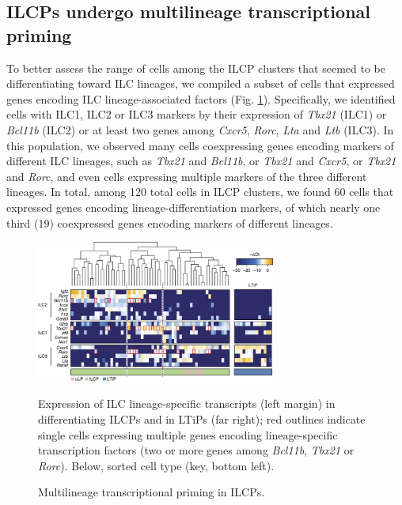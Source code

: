 \subsection{ILCPs undergo multilineage transcriptional priming}

To better assess the range of cells among the ILCP clusters that seemed to be differentiating toward ILC lineages, we compiled a subset of cells that expressed genes encoding ILC lineage-associated factors (Fig. \ref{fig:chap3_F6}). Specifically, we identified cells with ILC1, ILC2 or ILC3 markers by their expression of \textit{Tbx21} (ILC1) or \textit{Bcl11b} (ILC2) or at least two genes among \textit{Cxcr5}, \textit{Rorc}, \textit{Lta} and \textit{Ltb} (ILC3). In this population, we observed many cells coexpressing genes encoding markers of different ILC lineages, such as \textit{Tbx21} and \textit{Bcl11b}, or \textit{Tbx21} and \textit{Cxcr5}, or \textit{Tbx21} and \textit{Rorc}, and even cells expressing multiple markers of the three different lineages. In total, among 120 total cells in ILCP clusters, we found 60 cells that expressed genes encoding lineage-differentiation markers, of which nearly one third (19) coexpressed genes encoding markers of different lineages.

\begin{figure}[h]
\begin{center}
	\includegraphics[width=0.7\textwidth]{figures/chapter3/F6}
\end{center}
	\caption{Multilineage transcriptional priming in ILCPs.} 
	Expression of ILC lineage-specific transcripts (left margin) in differentiating ILCPs and in LTiPs (far right); red outlines indicate single cells expressing multiple genes encoding lineage-specific transcription factors (two or more genes among \textit{Bcl11b}, \textit{Tbx21} or \textit{Rorc}). Below, sorted cell type (key, bottom left).
	\label{fig:chap3_F6}
\end{figure}


